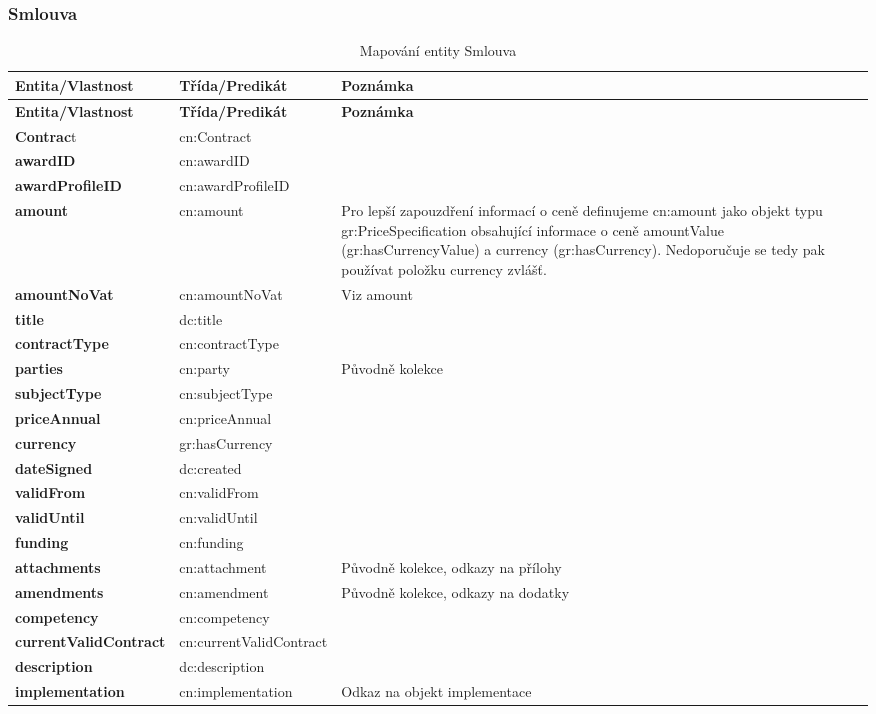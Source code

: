 \subsubsection*{Smlouva}

\begin{center}
\begin{longtable}{lp{30mm}p{65mm}}
\label{grid_mlmmh} \\
\multicolumn{1}{l}{\textbf{Entita/Vlastnost}} & 
\multicolumn{1}{l}{\textbf{Třída/Predikát}} & 
\multicolumn{1}{l}{\textbf{Poznámka}} \\ \hline 
\endfirsthead
\multicolumn{1}{l}{\textbf{Entita/Vlastnost}} & 
\multicolumn{1}{l}{\textbf{Třída/Predikát}} & 
\multicolumn{1}{l}{\textbf{Poznámka}} \\ \hline 
\hline
\endhead
\endfoot
\caption{Mapování entity Smlouva}
\endlastfoot
\textbf{Contrac}t & cn:Contract \\
\textbf{awardID} & cn:awardID \\
\textbf{awardProfileID} & cn:awardProfileID \\
\textbf{amount} & cn:amount & Pro lepší zapouzdření informací o ceně definujeme cn:amount jako objekt typu gr:PriceSpecification obsahující informace o ceně amountValue (gr:hasCurrencyValue) a currency (gr:hasCurrency). Nedoporučuje se tedy pak používat položku currency zvlášť. \\
\textbf{amountNoVat} & cn:amountNoVat & Viz amount \\
\textbf{title} & dc:title \\
\textbf{contractType} & cn:contractType \\
\textbf{parties} & cn:party & Původně kolekce\\
\textbf{subjectType} & cn:subjectType \\
\textbf{priceAnnual} & cn:priceAnnual \\
\textbf{currency} & gr:hasCurrency \\
\textbf{dateSigned} & dc:created \\
\textbf{validFrom} & cn:validFrom \\
\textbf{validUntil} & cn:validUntil \\
\textbf{funding} & cn:funding \\
\textbf{attachments} & cn:attachment & Původně kolekce, odkazy na přílohy  \\
\textbf{amendments} & cn:amendment & Původně kolekce, odkazy na dodatky \\
\textbf{competency} & cn:competency \\
\textbf{currentValidContract} & cn:currentValidContract \\
\textbf{description} & dc:description \\
\textbf{implementation} & cn:implementation & Odkaz na objekt implementace \\
\end{longtable}
\end{center}

